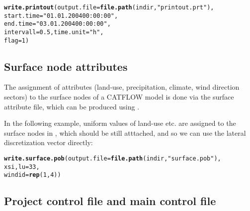 \documentclass[article,nojss]{jss}\usepackage[]{graphicx}\usepackage[]{xcolor}
\makeatletter
\newcommand{\hlnum}[1]{\textcolor[rgb]{0.686,0.059,0.569}{#1}}%
\newcommand{\hlsng}[1]{\textcolor[rgb]{0.192,0.494,0.8}{#1}}%
\newcommand{\hldef}[1]{\textcolor[rgb]{0.345,0.345,0.345}{#1}}%
\newcommand{\hlkwc}[1]{\textcolor[rgb]{0.333,0.667,0.333}{#1}}%
\newcommand{\hlkwd}[1]{\textcolor[rgb]{0.737,0.353,0.396}{\textbf{#1}}}%
\newenvironment{kframe}{%
 \def\at@end@of@kframe{}%
 \ifinner\ifhmode%
  \def\at@end@of@kframe{\end{minipage}}%
  \begin{minipage}{\columnwidth}%
 \fi\fi%
 \def\FrameCommand##1{\hskip\@totalleftmargin \hskip-\fboxsep
 \colorbox{shadecolor}{##1}\hskip-\fboxsep
     \hskip-\linewidth \hskip-\@totalleftmargin \hskip\columnwidth}%
 \MakeFramed {\advance\hsize-\width
   \@totalleftmargin\z@ \linewidth\hsize
   \@setminipage}}%
 {\par\unskip\endMakeFramed%
 \at@end@of@kframe}
\newenvironment{knitrout}{}{} %
\makeatother
\begin{document}
\begin{knitrout}
\color{fgcolor}\begin{kframe}
\begin{alltt}
 \hlkwd{write.printout}\hldef{(}\hlkwc{output.file} \hldef{=}  \hlkwd{file.path}\hldef{(indir,} \hlsng{"printout.prt"}\hldef{),}
                 \hlkwc{start.time} \hldef{=} \hlsng{"01.01.2004 00:00:00"}\hldef{,}
                 \hlkwc{end.time} \hldef{=} \hlsng{"03.01.2004 00:00:00"}\hldef{,}
                 \hlkwc{intervall} \hldef{=} \hlnum{0.5}\hldef{,} \hlkwc{time.unit} \hldef{=} \hlsng{"h"}\hldef{,}
                 \hlkwc{flag} \hldef{=} \hlnum{1}\hldef{)}
\end{alltt}
\end{kframe}
\end{knitrout}
 

\subsection{Surface node attributes} 

The assignment of attributes (land-use, precipitation, climate, wind direction sectors)
to the surface nodes of a CATFLOW model is done via the surface attribute file, which can be
produced using . 

In the following example, uniform values of land-use etc. are assigned to the surface nodes 
in , which should be still atttached, and so we can use the lateral discretization vector  directly:

\begin{knitrout}
\color{fgcolor}\begin{kframe}
\begin{alltt}
   \hlkwd{write.surface.pob}\hldef{(}\hlkwc{output.file} \hldef{=}  \hlkwd{file.path}\hldef{(indir,} \hlsng{"surface.pob"}\hldef{),}
                    \hldef{xsi,} \hlkwc{lu} \hldef{=} \hlnum{33}\hldef{,}
                    \hlkwc{windid} \hldef{=} \hlkwd{rep}\hldef{(}\hlnum{1}\hldef{,}\hlnum{4}\hldef{))}
\end{alltt}
\end{kframe}
\end{knitrout}
 



\subsection{Project control file and main control file} 
\end{document}
